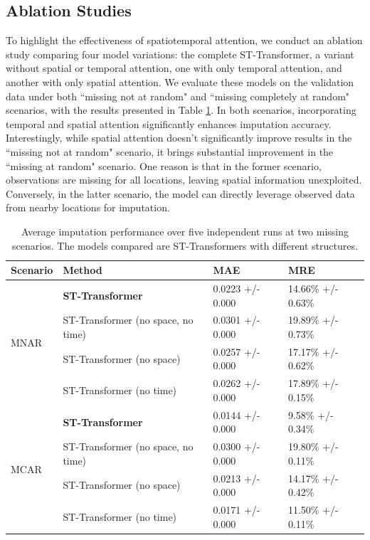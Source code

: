 \documentclass[review]{elsarticle}
\begin{document}
\subsection{Ablation Studies}

To highlight the effectiveness of spatiotemporal attention, we conduct an ablation study comparing four model variations: the complete ST-Transformer, a variant without spatial or temporal attention, one with only temporal attention, and another with only spatial attention. We evaluate these models on the validation data under both ``missing not at random" and ``missing completely at random" scenarios, with the results presented in Table \ref{tab: ablation_study_1}. In both scenarios, incorporating temporal and spatial attention significantly enhances imputation accuracy. Interestingly, while spatial attention doesn't significantly improve results in the ``missing not at random" scenario, it brings substantial improvement in the ``missing at random" scenario. One reason is that in the former scenario, observations are missing for all locations, leaving spatial information unexploited. Conversely, in the latter scenario, the model can directly leverage observed data from nearby locations for imputation.

\begin{table}[h!]
    \centering
    \begin{tabularx}{\textwidth}{lXXX}
        \toprule
         Scenario&Method & MAE & MRE \\
        \midrule
        \multirow{4}{*}{MNAR}&\textbf{ST-Transformer} & 0.0223 +/- 0.000 & 14.66\% +/- 0.63\%  \\
        &ST-Transformer (no space, no time) & 0.0301 +/- 0.000& 19.89\% +/- 0.73\%\\
        &ST-Transformer (no space) & 0.0257 +/- 0.000& 17.17\% +/- 0.62\% \\
        &ST-Transformer (no time) & 0.0262 +/- 0.000 & 17.89\% +/- 0.15\% \\
        \midrule
        \multirow{4}{*}{MCAR}&\textbf{ST-Transformer} & 0.0144 +/- 0.000 & 9.58\% +/- 0.34\%  \\
        &ST-Transformer (no space, no time) & 0.0300 +/- 0.000& 19.80\% +/- 0.11\%\\
        &ST-Transformer (no space) & 0.0213 +/- 0.000& 14.17\% +/- 0.42\% \\
        &ST-Transformer (no time) & 0.0171 +/- 0.000 & 11.50\% +/- 0.11\% \\
        \bottomrule

    \end{tabularx}
    \caption{Average imputation performance over five independent runs at two missing scenarios. The models compared are ST-Transformers with different structures.}
    \label{tab: ablation_study_1}
\end{table}
\end{document}
